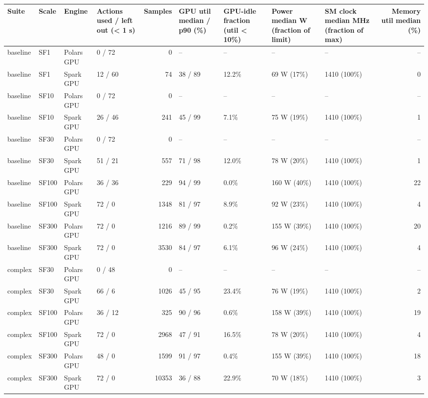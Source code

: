\begin{longtable}{llllrllllr}
\toprule
Suite & Scale & Engine & Actions used / left out (< 1 s) & Samples & GPU util median / p90 (\%) & GPU-idle fraction (util < 10\%) & Power median W (fraction of limit) & SM clock median MHz (fraction of max) & Memory util median (\%) \\
\midrule
\endhead
\bottomrule
\endfoot
baseline & SF1 & Polars GPU & 0 / 72 & 0 & -- & -- & -- & -- & -- \\
baseline & SF1 & Spark GPU & 12 / 60 & 74 & 38 / 89 & 12.2\% & 69 W (17\%) & 1410 (100\%) & 0 \\
baseline & SF10 & Polars GPU & 0 / 72 & 0 & -- & -- & -- & -- & -- \\
baseline & SF10 & Spark GPU & 26 / 46 & 241 & 45 / 99 & 7.1\% & 75 W (19\%) & 1410 (100\%) & 1 \\
baseline & SF30 & Polars GPU & 0 / 72 & 0 & -- & -- & -- & -- & -- \\
baseline & SF30 & Spark GPU & 51 / 21 & 557 & 71 / 98 & 12.0\% & 78 W (20\%) & 1410 (100\%) & 1 \\
baseline & SF100 & Polars GPU & 36 / 36 & 229 & 94 / 99 & 0.0\% & 160 W (40\%) & 1410 (100\%) & 22 \\
baseline & SF100 & Spark GPU & 72 / 0 & 1348 & 81 / 97 & 8.9\% & 92 W (23\%) & 1410 (100\%) & 4 \\
baseline & SF300 & Polars GPU & 72 / 0 & 1216 & 89 / 99 & 0.2\% & 155 W (39\%) & 1410 (100\%) & 20 \\
baseline & SF300 & Spark GPU & 72 / 0 & 3530 & 84 / 97 & 6.1\% & 96 W (24\%) & 1410 (100\%) & 4 \\
complex & SF30 & Polars GPU & 0 / 48 & 0 & -- & -- & -- & -- & -- \\
complex & SF30 & Spark GPU & 66 / 6 & 1026 & 45 / 95 & 23.4\% & 76 W (19\%) & 1410 (100\%) & 2 \\
complex & SF100 & Polars GPU & 36 / 12 & 325 & 90 / 96 & 0.6\% & 158 W (39\%) & 1410 (100\%) & 19 \\
complex & SF100 & Spark GPU & 72 / 0 & 2968 & 47 / 91 & 16.5\% & 78 W (20\%) & 1410 (100\%) & 4 \\
complex & SF300 & Polars GPU & 48 / 0 & 1599 & 91 / 97 & 0.4\% & 155 W (39\%) & 1410 (100\%) & 18 \\
complex & SF300 & Spark GPU & 72 / 0 & 10353 & 36 / 88 & 22.9\% & 70 W (18\%) & 1410 (100\%) & 3 \\
\end{longtable}
